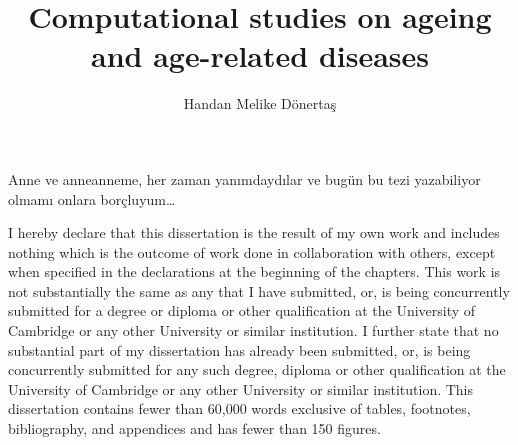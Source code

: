 \documentclass[12pt,twoside]{unicam}
\title{Computational studies on ageing and age-related diseases}
\author{Handan Melike Dönertaş}
\subtitle{}
\date{}
\begin{document}
  \maketitle

\frontmatter %
\pagestyle{empty} %

  \begin{dedication}
    Anne ve anneanneme, her zaman yanımdaydılar ve bugün bu tezi yazabiliyor olmamı onlara borçluyum\ldots{}
  \end{dedication}

  \begin{declaration}
    I hereby declare that this dissertation is the result of my own work and includes nothing which is the outcome of work done in collaboration with others, except when specified in the declarations at the beginning of the chapters. This work is not substantially the same as any that I have submitted, or, is being concurrently submitted for a degree or diploma or other qualification at the University of Cambridge or any other University or similar institution. I further state that no substantial part of my dissertation has already been submitted, or, is being concurrently submitted for any such degree, diploma or other qualification at the University of Cambridge or any other University or similar institution. This dissertation contains fewer than 60,000 words exclusive of tables, footnotes, bibliography, and appendices and has fewer than 150 figures.
  \end{declaration}
\end{document}
